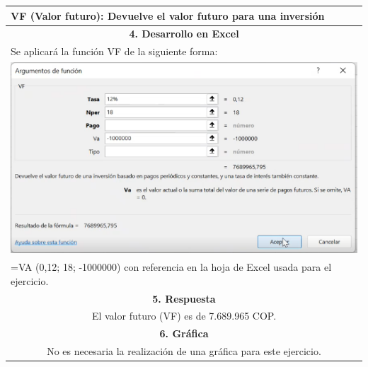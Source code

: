 \begin{center}
\begin{longtable}[H]{|p{0.5\linewidth}|p{0.5\linewidth}|}
  \multicolumn{2}{|l|}{VF (Valor futuro): Devuelve el valor futuro para una inversión}              \\ \hline
  \multicolumn{2}{|c|}{\cellcolor[HTML]{FFB183}\textbf{4. Desarrollo en Excel}}                       \\ \hline
  \multicolumn{2}{|l|}{Se aplicará la función VF de la siguiente forma:}                              \\
  \multicolumn{2}{|c|}{ \includegraphics[trim=-5 -5 -5 -5 ,width=1\columnwidth]{1/Ejem1.PNG}}         \\
  \multicolumn{2}{|l|}{=VA (0,12; 18; -1000000) con referencia en la hoja de Excel usada para el ejercicio.} \\ \hline
  \multicolumn{2}{|c|}{\cellcolor[HTML]{FFB183}\textbf{5. Respuesta}}                                 \\ \hline
  \multicolumn{2}{|c|}{El valor futuro (VF) es de  7.689.965 COP.}               \\ \hline
  \multicolumn{2}{|c|}{\cellcolor[HTML]{FFB183}\textbf{6. Gráfica}}                                   \\ \hline
  \multicolumn{2}{|c|}{No es necesaria la realización de una gráfica para este ejercicio.}            \\ \hline
 \end{longtable}
\end{center}
